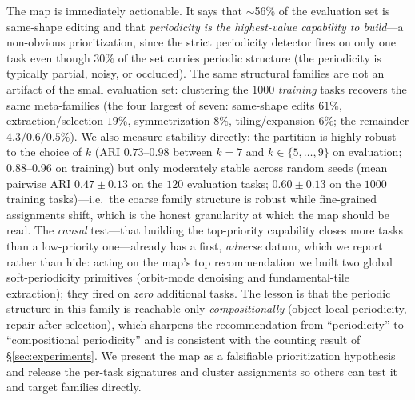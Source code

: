 The map is immediately actionable. It says that $\sim$56\% of the evaluation set is same-shape editing and
that \emph{periodicity is the highest-value capability to build}---a non-obvious prioritization, since the
strict periodicity detector fires on only one task even though $30\%$ of the set carries periodic structure
(the periodicity is typically partial, noisy, or occluded). The same structural families are not an artifact
of the small evaluation set: clustering the $1000$ \emph{training} tasks recovers the same meta-families
(the four largest of seven: same-shape edits $61\%$, extraction/selection $19\%$, symmetrization $8\%$,
tiling/expansion $6\%$; the remainder $4.3/0.6/0.5\%$). We also measure stability directly: the partition is highly robust to the choice of
$k$ (ARI $0.73$--$0.98$ between $k{=}7$ and $k\in\{5,\dots,9\}$ on evaluation; $0.88$--$0.96$ on training) but
only moderately stable across random seeds (mean pairwise ARI $0.47\pm0.13$ on the $120$ evaluation tasks;
$0.60\pm0.13$ on the $1000$ training tasks)---i.e.\ the coarse family structure is robust while fine-grained
assignments shift, which is the honest granularity at which the map should be read. The \emph{causal} test---that building the top-priority capability closes more tasks than a low-priority
one---already has a first, \emph{adverse} datum, which we report rather than hide: acting on the map's top
recommendation we built two global soft-periodicity primitives (orbit-mode denoising and fundamental-tile
extraction); they fired on \emph{zero} additional tasks. The lesson is that the periodic structure in this
family is reachable only \emph{compositionally} (object-local periodicity, repair-after-selection), which
sharpens the recommendation from ``periodicity'' to ``compositional periodicity'' and is consistent with the
counting result of \S\ref{sec:experiments}. We present the map as a falsifiable prioritization hypothesis and
release the per-task signatures and cluster assignments so others can test it and target families directly.
